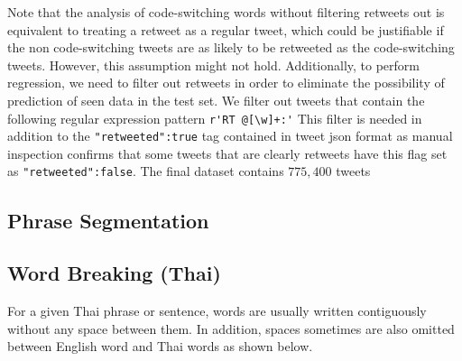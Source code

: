 \documentclass[conference]{IEEEtran}
\begin{document}
Note that the analysis of code-switching words without filtering retweets out is equivalent to treating a retweet as a regular tweet, which could be justifiable if the non code-switching tweets are as likely to be retweeted as the code-switching tweets. However, this assumption might not hold. Additionally, to perform regression, we need to filter out retweets in order to eliminate the possibility of prediction of seen data in the test set. We filter out tweets that contain the following regular expression pattern \verb|r'RT @[\w]+:'| This filter is needed in addition to the {\tt "retweeted":true} tag contained in tweet json format as manual inspection confirms that some tweets that are clearly retweets  have this flag set as {\tt "retweeted":false}. The final dataset contains $775,400$ tweets 



\subsection{Phrase Segmentation}









\subsection{Word Breaking (Thai) }
For a given Thai phrase or sentence, words are  usually written contiguously without any space between them. In addition, spaces sometimes are also omitted between English word and Thai words as shown below.   


\end{document}

